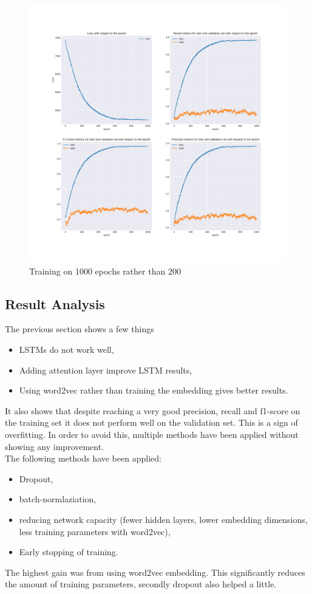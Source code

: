 \begin{figure}
 \centering
 \includegraphics[width=\textwidth]{images/chapitre4/attention3}
 \caption{Training on 1000 epochs rather than 200}
 \label{fig:chap4:att3:f1.1}
\end{figure}
\subsection{Result Analysis}
The previous section shows a few things
\begin{itemize}
 \item LSTMs do not work well,
 \item Adding attention layer improve LSTM results,
 \item Using word2vec rather than training the embedding gives better results.
\end{itemize}
It also shows that despite reaching a very good precision, recall and f1-score on the training set it does not perform well on the validation set. This is a sign of overfitting. In order to avoid this, multiple methods have been applied without showing any improvement. \\

The following methods have been applied: 
\begin{itemize}
 \item Dropout\cite{srivastava2014dropout}, 
 \item batch-normlaziation\cite{Ioffe2015},
 \item reducing network capacity (fewer hidden layers, lower embedding dimensions, less training parameters with word2vec),
 \item Early stopping of training.
\end{itemize}
The highest gain was from using word2vec embedding. This significantly reduces the amount of training parameters, secondly dropout also helped a little. 

